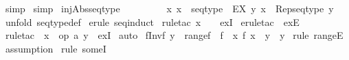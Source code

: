 \begin{isabellebody}
\isamarkupfalse%
\ simp\isanewline
{}\isamarkupfalse%
\ simp\isanewline
{}\isamarkupfalse%
%
\endisatagproof
{\isafoldproof}%
%
\isadelimproof
\isanewline
%
\endisadelimproof
\isanewline
\isanewline
\isanewline
{}\isamarkupfalse%
\ inj{\isacharunderscore}Abs{\isacharunderscore}seqtype{}{\isacharcolon}\ \isanewline
\ \ \ \ \ \ \ \ {\isachardoublequoteopen}{\isacharbang}{\isacharbang}x{\isachardot}\ x\ {\isacharcolon}\ seqtype\ {\isacharequal}{\isacharequal}{\isachargreater}\ {\isacharparenleft}EX\ y{\isachardot}\ x\ {\isacharequal}\ Rep{\isacharunderscore}seqtype\ y{\isacharparenright}{\isachardoublequoteclose}\isanewline
%
\isadelimproof
%
\endisadelimproof
%
\isatagproof
{}\isamarkupfalse%
\ {\isacharparenleft}unfold\ seqtype{\isacharunderscore}def{\isacharparenright}\isanewline
{}\isamarkupfalse%
\ {\isacharparenleft}erule\ seq{\isacharunderscore}induct{\isacharparenright}\isanewline
{}\isamarkupfalse%
\ {\isacharparenleft}rule{\isacharunderscore}tac\ x\ {\isacharequal}\ {\isachardoublequoteopen}{\isacharbrackleft}{\isacharbrackright}{\isachardoublequoteclose}\ \ exI{\isacharparenright}\isanewline
{}\isamarkupfalse%
\ {\isacharparenleft}erule{\isacharunderscore}tac\ {\isacharbrackleft}{}{\isacharbrackright}\ exE{\isacharparenright}\isanewline
{}\isamarkupfalse%
\ {\isacharparenleft}rule{\isacharunderscore}tac\ {\isacharbrackleft}{}{\isacharbrackright}\ x\ {\isacharequal}\ {\isachardoublequoteopen}op{\isacharhash}\ a\ y{\isachardoublequoteclose}\ \ exI{\isacharparenright}\isanewline
{}\isamarkupfalse%
\ auto\isanewline
{}\isamarkupfalse%
%
\endisatagproof
{\isafoldproof}%
%
\isadelimproof
\isanewline
%
\endisadelimproof
\isanewline
{}\isamarkupfalse%
\ f{\isacharunderscore}Inv{\isacharunderscore}f{\isacharcolon}\ {\isachardoublequoteopen}y\ {\isacharcolon}\ range{\isacharparenleft}f{\isacharparenright}\ {\isacharequal}{\isacharequal}{\isachargreater}\ f\ {\isacharparenleft}{\isacharat}\ x{\isachardot}\ f\ x\ {\isacharequal}\ y{\isacharparenright}\ {\isacharequal}\ y{\isachardoublequoteclose}\isanewline
%
\isadelimproof
%
\endisadelimproof
%
\isatagproof
{}\isamarkupfalse%
\ {\isacharparenleft}rule\ rangeE{\isacharparenright}\isanewline
{}\isamarkupfalse%
\ assumption\isanewline
{}\isamarkupfalse%
\ {\isacharparenleft}rule\ someI{\isacharparenright}\isanewline

\end{isabellebody}
